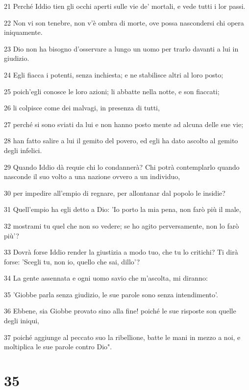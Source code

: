 \par 21 Perché Iddio tien gli occhi aperti sulle vie de' mortali, e vede tutti i lor passi.
\par 22 Non vi son tenebre, non v'è ombra di morte, ove possa nascondersi chi opera iniquamente.
\par 23 Dio non ha bisogno d'osservare a lungo un uomo per trarlo davanti a lui in giudizio.
\par 24 Egli fiacca i potenti, senza inchiesta; e ne stabilisce altri al loro posto;
\par 25 poich'egli conosce le loro azioni; li abbatte nella notte, e son fiaccati;
\par 26 li colpisce come dei malvagi, in presenza di tutti,
\par 27 perché si sono sviati da lui e non hanno posto mente ad alcuna delle sue vie;
\par 28 han fatto salire a lui il gemito del povero, ed egli ha dato ascolto al gemito degli infelici.
\par 29 Quando Iddio dà requie chi lo condannerà? Chi potrà contemplarlo quando nasconde il suo volto a una nazione ovvero a un individuo,
\par 30 per impedire all'empio di regnare, per allontanar dal popolo le insidie?
\par 31 Quell'empio ha egli detto a Dio: 'Io porto la mia pena, non farò più il male,
\par 32 mostrami tu quel che non so vedere; se ho agito perversamente, non lo farò più'?
\par 33 Dovrà forse Iddio render la giustizia a modo tuo, che tu lo critichi? Ti dirà forse: 'Scegli tu, non io, quello che sai, dillo'?
\par 34 La gente assennata e ogni uomo savio che m'ascolta, mi diranno:
\par 35 'Giobbe parla senza giudizio, le sue parole sono senza intendimento'.
\par 36 Ebbene, sia Giobbe provato sino alla fine! poiché le sue risposte son quelle degli iniqui,
\par 37 poiché aggiunge al peccato suo la ribellione, batte le mani in mezzo a noi, e moltiplica le sue parole contro Dio".

\chapter{35}

